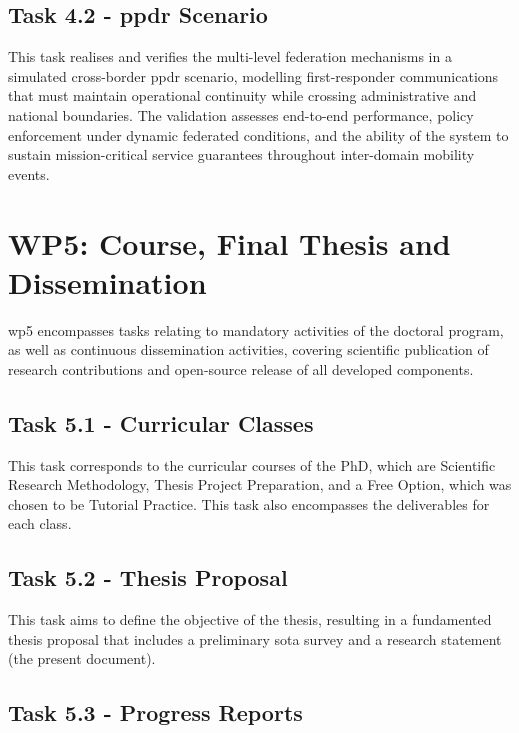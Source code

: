 \subsection{Task 4.2 - \ac{ppdr} Scenario}

This task realises and verifies the multi-level federation mechanisms in a simulated cross-border \ac{ppdr} scenario, modelling first-responder communications that must maintain operational continuity while crossing administrative and national boundaries. The validation assesses end-to-end performance, policy enforcement under dynamic federated conditions, and the ability of the system to sustain mission-critical service guarantees throughout inter-domain mobility events.

\section{WP5: Course, Final Thesis and Dissemination}

\ac{wp}5 encompasses tasks relating to mandatory activities of the doctoral program, as well as continuous dissemination activities, covering scientific publication of research contributions and open-source release of all developed components.

\subsection{Task 5.1 - Curricular Classes}

This task corresponds to the curricular courses of the PhD, which are Scientific Research Methodology, Thesis Project Preparation, and a Free Option, which was chosen to be Tutorial Practice. This task also encompasses the deliverables for each class.

\subsection{Task 5.2 - Thesis Proposal}

This task aims to define the objective of the thesis, resulting in a fundamented thesis proposal that includes a preliminary \ac{sota} survey and a research statement (the present document).

\subsection{Task 5.3 - Progress Reports}

